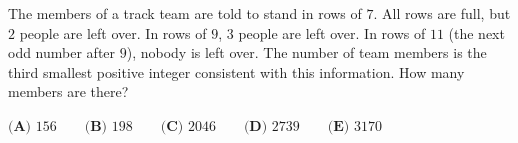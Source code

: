 The members of a track team are told to stand in rows of $7$. All rows are full, but $2$ people are left over. In rows of $9$, $3$ people are left over. In rows of $11$ (the next odd number after $9$), nobody is left over. The number of team members is the third smallest positive integer consistent with this information. How many members are there?

$\textbf{(A) } 156 \qquad \textbf{(B) } 198 \qquad \textbf{(C) } 2046 \qquad \textbf{(D) } 2739 \qquad \textbf{(E) } 3170$
